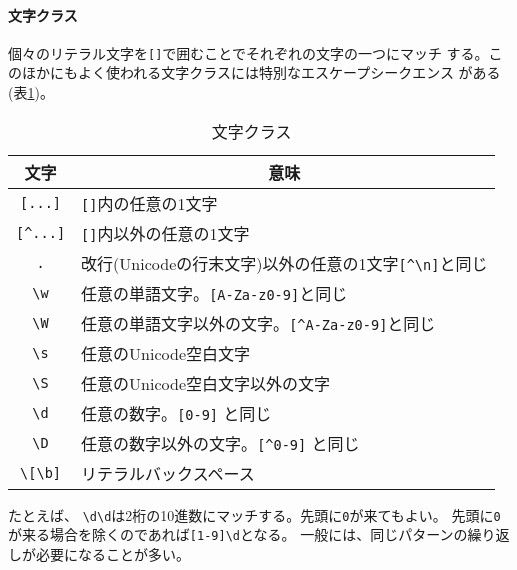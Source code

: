 \paragraph{文字クラス}
個々のリテラル文字を\texttt{[]}で囲むことでそれぞれの文字の一つにマッチ
する。このほかにもよく使われる文字クラスには特別なエスケープシークエンス
がある(表\ref{characterclass})。
\begin{table}[ht]
 \caption{文字クラス}\label{characterclass}
\begin{center}
 \begin{tabular}{|c|l|}\hline
  文字&\multicolumn{1}{c|}{意味}\\\hline
  \texttt{[...]}&\texttt{[]}内の任意の1文字\\\hline
  \verb+[^...]+& \texttt{[]}内以外の任意の1文字\\ \hline
  \verb+.+& 改行(Unicodeの行末文字)以外の任意の1文字\verb+[^\n]+と同じ\\ \hline
  \verb+\w+& 任意の単語文字。\verb+[A-Za-z0-9]+と同じ\\ \hline
  \verb+\W+& 任意の単語文字以外の文字。\verb+[^A-Za-z0-9]+と同じ\\ \hline
  \verb+\s+& 任意のUnicode空白文字\\ \hline
  \verb+\S+& 任意のUnicode空白文字以外の文字\\ \hline
  \verb+\d+& 任意の数字。\verb+[0-9]+ と同じ\\ \hline
  \verb+\D+&任意の数字以外の文字。\verb+[^0-9]+ と同じ\\\hline
  \verb+\[\b]+& リテラルバックスペース\\ \hline
 \end{tabular}
\end{center}
\end{table}

たとえば、 \verb+\d\d+は2桁の10進数にマッチする。先頭に\verb+0+が来てもよい。
       先頭に\verb+0+が来る場合を除くのであれば\verb+[1-9]\d+となる。
一般には、同じパターンの繰り返しが必要になることが多い。
